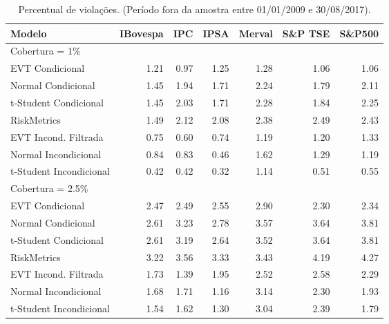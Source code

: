 \begin{table}[H]
\centering
\caption{Percentual de violações. (Período fora da amostra entre 01/01/2009 e 30/08/2017).} 
\label{tab:varviol}
\begin{tabular}{lrrrrrr}
  \hline
Modelo & IBovespa & IPC & IPSA & Merval & S\&P TSE & S\&P500 \\ 
  \hline
Cobertura = 1\% &  &  &  &  &  &  \\ 
  EVT Condicional & 1.21 & 0.97 & 1.25 & 1.28 & 1.06 & 1.06 \\ 
  Normal Condicional & 1.45 & 1.94 & 1.71 & 2.24 & 1.79 & 2.11 \\ 
  t-Student Condicional & 1.45 & 2.03 & 1.71 & 2.28 & 1.84 & 2.25 \\ 
  RiskMetrics & 1.49 & 2.12 & 2.08 & 2.38 & 2.49 & 2.43 \\ 
  EVT Incond. Filtrada & 0.75 & 0.60 & 0.74 & 1.19 & 1.20 & 1.33 \\ 
  Normal Incondicional & 0.84 & 0.83 & 0.46 & 1.62 & 1.29 & 1.19 \\ 
  t-Student Incondicional & 0.42 & 0.42 & 0.32 & 1.14 & 0.51 & 0.55 \\ 
  Cobertura = 2.5\% &  &  &  &  &  &  \\ 
  EVT Condicional & 2.47 & 2.49 & 2.55 & 2.90 & 2.30 & 2.34 \\ 
  Normal Condicional & 2.61 & 3.23 & 2.78 & 3.57 & 3.64 & 3.81 \\ 
  t-Student Condicional & 2.61 & 3.19 & 2.64 & 3.52 & 3.64 & 3.81 \\ 
  RiskMetrics & 3.22 & 3.56 & 3.33 & 3.43 & 4.19 & 4.27 \\ 
  EVT Incond. Filtrada & 1.73 & 1.39 & 1.95 & 2.52 & 2.58 & 2.29 \\ 
  Normal Incondicional & 1.68 & 1.71 & 1.16 & 3.14 & 2.30 & 1.93 \\ 
  t-Student Incondicional & 1.54 & 1.62 & 1.30 & 3.04 & 2.39 & 1.79 \\ 
   \hline
\end{tabular}
\end{table}
